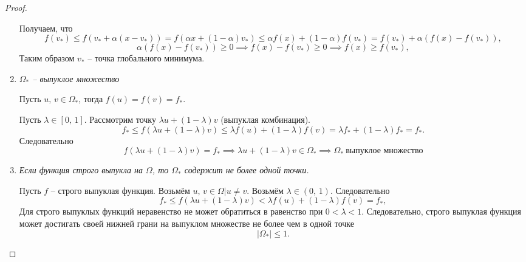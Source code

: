 \begin{theorem}
\begin{proof}
\begin{enumerate}[label=(\arabic*)]
		Получаем, что 
		\begin{equation*}
		f(v_*) \leq f(v_* + \alpha(x-v_*)) = f(\alpha x + (1-\alpha)v_*)\leq \alpha f(x) + (1-\alpha)f(v_*) = f(v_*) + \alpha(f(x)-f(v_*)),
		\end{equation*}
		\begin{equation*}
			\alpha(f(x)-f(v_*))\geq 0 \implies f(x)-f(v_*)\geq0\implies f(x)\geq f(v_*),
		\end{equation*}
		Таким образом $v_*$ -- точка глобального минимума.
		\item \textit{$\Omega_*$ -- выпуклое множество}
		
		Пусть $u,\,v\in \Omega_*$, тогда $f(u)=f(v)=f_*$.
		
		Пусть $\lambda\in \left[0,\,1\right]$. Рассмотрим точку $\lambda u + (1-\lambda)v$ (выпуклая комбинация).
		\begin{equation*}
			f_* \leq f(\lambda u + (1-\lambda)v)\leq \lambda f(u)+(1-\lambda)f(v)=\lambda f_*+(1-\lambda)f_*=f_*.
		\end{equation*}
		Следовательно
		\begin{equation*}
			f(\lambda u + (1-\lambda)v)=f_* \implies \lambda u + (1-\lambda)v\in \Omega_* \implies \Omega_*~\text{выпуклое множество}
		\end{equation*}
		
		\item \textit{Если функция строго выпукла на $\Omega$, то $\Omega_*$ содержит не более одной точки.}
		
		Пусть $f$ -- строго выпуклая функция. Возьмём $u,\,v\in \Omega \big| u\neq v$. Возьмём $\lambda\in\left(0,\,1\right)$. Следовательно
		\begin{equation*}
			f_*\leq f(\lambda u + (1-\lambda)v) < \lambda f(u) + (1-\lambda)f(v) = f_*,
		\end{equation*}
		Для строго выпуклых функций неравенство не может обратиться в равенство при $0<\lambda<1$. Следовательно, строго выпуклая функция может достигать своей нижней грани на выпуклом множестве не более чем в одной точке
		\begin{equation*}
			\left|\Omega_*\right|\leq1.
		\end{equation*}
		\end{enumerate}
	\end{proof}
\end{theorem}